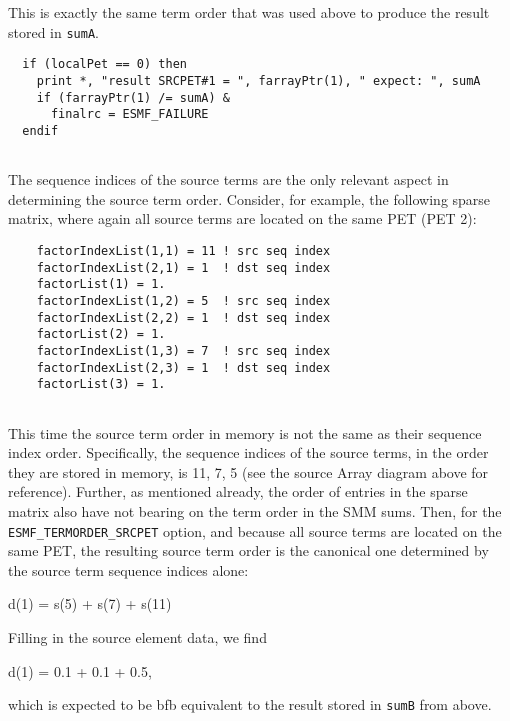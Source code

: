    This is exactly the same term order that was used above to produce the
   result stored in {\tt sumA}. 

 \begin{verbatim}
  if (localPet == 0) then
    print *, "result SRCPET#1 = ", farrayPtr(1), " expect: ", sumA
    if (farrayPtr(1) /= sumA) &
      finalrc = ESMF_FAILURE
  endif
 
\end{verbatim}
 

   The sequence indices of the source terms are the only relevant aspect in 
   determining the source term order. Consider, for example, the following 
   sparse matrix, where again all source terms are located on the same PET 
   (PET 2): 

 \begin{verbatim}
    factorIndexList(1,1) = 11 ! src seq index
    factorIndexList(2,1) = 1  ! dst seq index
    factorList(1) = 1.
    factorIndexList(1,2) = 5  ! src seq index
    factorIndexList(2,2) = 1  ! dst seq index
    factorList(2) = 1.
    factorIndexList(1,3) = 7  ! src seq index
    factorIndexList(2,3) = 1  ! dst seq index
    factorList(3) = 1.
 
\end{verbatim}
 

   This time the source term order in memory is not the same
   as their sequence index order. Specifically, the sequence indices of the
   source terms, in the order they are stored in memory, is 11, 7, 5 (see the
   source Array diagram above for reference). 
   Further, as mentioned already, the order of entries in the sparse matrix
   also have not bearing on the term order in the SMM sums.
   Then, for the {\tt ESMF\_TERMORDER\_SRCPET} option, and because all source
   terms are located on the same PET, the resulting source term order is the 
   canonical one determined by the source term sequence indices alone:
  
       d(1) = s(5) + s(7) + s(11)
  
   Filling in the source element data, we find
   
       d(1) = 0.1 + 0.1 + 0.5,
  
   which is expected to be bfb equivalent to the result stored in {\tt sumB}
   from above. 


